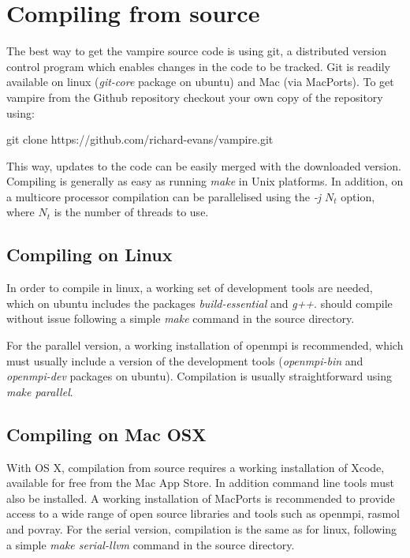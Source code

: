 \section*{Compiling from source}
The best way to get the vampire source code is using git, a distributed version
control program which enables changes in the code to be tracked. Git is readily
available on linux (\textit{git-core} package on ubuntu) and Mac (via MacPorts).
To get vampire from the Github repository checkout your own copy of the
repository using:

\noindent
\begin{minipage}[c]{\textwidth}
\centering
git clone https://github.com/richard-evans/vampire.git
\end{minipage}

This way, updates to the code can be easily merged with the downloaded version.
Compiling is generally as easy as running \textit{make} in Unix platforms. In
addition, on a multicore processor compilation can be parallelised using the
\textit{-j $N_t$} option, where $N_t$ is the number of threads to use.

\subsection*{Compiling on Linux}
In order to compile in linux, a working set of development tools are needed,
which on ubuntu includes the packages \textit{build-essential} and \textit{g++}.
\vampire should compile without issue following a simple \textit{make} command
in the source directory.

For the parallel version, a working installation of openmpi is recommended,
which must usually include a version of the development tools
(\textit{openmpi-bin} and \textit{openmpi-dev} packages on ubuntu). Compilation
is usually straightforward using \textit{make parallel}.

\subsection*{Compiling on Mac OSX}
 With OS X,
compilation from source requires a working installation of Xcode, available for
free from the Mac App Store. In addition command line tools must also be
installed. A working installation of MacPorts is recommended to provide access
to a wide range of open source libraries and tools such as openmpi, rasmol and
povray. For the serial version, compilation is the same as for linux, following
a simple \textit{make serial-llvm} command in the source directory.

